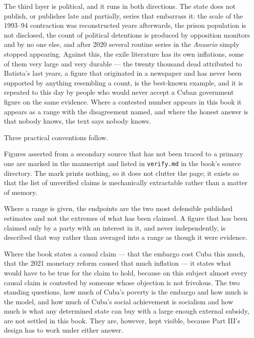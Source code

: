 The third layer is political, and it runs in both directions. The state does
not publish, or publishes late and partially, series that embarrass it: the
scale of the 1993--94 contraction was reconstructed years afterwards, the
prison population is not disclosed, the count of political detentions is
produced by opposition monitors and by no one else, and after 2020 several
routine series in the \emph{Anuario} simply stopped appearing. Against this,
the exile literature has its own inflations, some of them very large and very
durable --- the twenty thousand dead attributed to Batista's last years, a
figure that originated in a newspaper and has never been supported by anything
resembling a count, is the best-known example, and it is repeated to this day
by people who would never accept a Cuban government figure on the same
evidence. Where a contested number appears in this book it appears as a range
with the disagreement named, and where the honest answer is that nobody knows,
the text says nobody knows.

Three practical conventions follow.

Figures asserted from a secondary source that has not been traced to a primary
one are marked in the manuscript and listed in \texttt{verify.md} in the book's
source directory. The mark prints nothing, so it does not clutter the page; it
exists so that the list of unverified claims is mechanically extractable rather
than a matter of memory.

Where a range is given, the endpoints are the two most defensible published
estimates and not the extremes of what has been claimed. A figure that has been
claimed only by a party with an interest in it, and never independently, is
described that way rather than averaged into a range as though it were
evidence.

Where the book states a causal claim --- that the embargo cost Cuba this much,
that the 2021 monetary reform caused that much inflation --- it states what
would have to be true for the claim to hold, because on this subject almost
every causal claim is contested by someone whose objection is not frivolous.
The two standing questions, how much of Cuba's poverty is the embargo and how
much is the model, and how much of Cuba's social achievement is socialism and
how much is what any determined state can buy with a large enough external
subsidy, are not settled in this book. They are, however, kept visible, because
Part III's design has to work under either answer.
